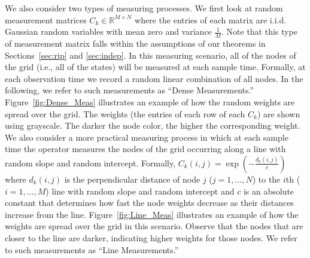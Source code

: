 \documentclass[11pt,draftcls,onecolumn]{IEEEtran}
\def\real    { \mathbb{R} }
\newcommand{\cut}[1]{}
\def\real    { \mathbb{R} }
\begin{document}
We also consider two types of measuring processes. We first look at random measurement matrices $C_k \in \real^{M \times N}$ where the entries of each matrix are \ac{i.i.d.} Gaussian random variables with mean zero and variance $\frac{1}{M}$.
Note that this type of measurement matrix falls within the assumptions of our theorems in Sections~\ref{sec:rip} and \ref{sec:indep}. In this measuring scenario, all of the nodes of the grid (i.e., all of the states) will be measured at each sample time. Formally, at each observation time we record a random linear combination of all nodes.
In the following, we refer to such measurements as ``Dense Measurements.'' Figure~\ref{fig:Dense_Meas} illustrates an example of how the random weights are spread over the grid. The weights (the entries of each row of each $C_k$) are shown using grayscale. The darker the node color, the higher the corresponding weight.
We also consider a more practical measuring process in which at each sample time the operator measures the nodes of the grid occurring along a line with random slope and random intercept. Formally, $C_k\left(i,j\right) = \exp\left(-\frac{d_k\left(i,j\right)}{c}\right)$
where $d_k\left(i,j\right)$ is the perpendicular
distance of node $j$ ($j = 1, \dots, N$) to the $i$th ($i = 1, \dots, M$) line with random slope and random intercept and $c$ is an absolute constant that determines how fast the node weights decrease as their distances increase from the line. Figure~\ref{fig:Line_Meas} illustrates an example of how the weights are spread over the grid in this scenario. Observe that the nodes that are closer to the line are darker, indicating higher weights for those nodes.\cut{
The slope and the intercept of the line is random for each measurement.
Put formally, the entries of each row of each measurement matrix $C_k \in \real^{M \times N}$ are generated as a function of the perpendicular distances of all nodes of the grid to a random line. A random line in this context is a line with a random slope and a random intercept that passes through the field. In other words, in order to take a measurement in this scenario, we first generate a random line and then calculate the perpendicular distances of all the points of the grid to this line. The entries of the corresponding row of $C_k$ are functions of these distances. We use an exponential function for this regard.} We refer to such measurements as ``Line Measurements.''
\end{document}
